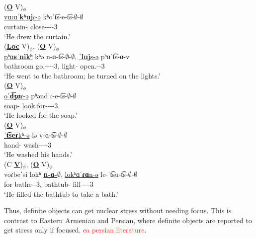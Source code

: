 \begin{exe}
\begin{xlist}
		\ex \glll   (\textbf{\underline{O}} V)$_\phi$ \\
		\underline{vɑɾɑˈ\textbf{kʰuj}ɾ-ə} kʰoˈt͡s-e-t͡s-$\emptyset$-$\emptyset$\\
		curtain-{} close-{\thgloss}-{\aorperf}-{\pst}-3{\sg} \\
		\trans `He drew the curtain.' \\
		\ex \glll   (\textbf{\underline{Loc}} V)$_\phi$,    (\textbf{\underline{O}} V)$_\phi$ \\
		\underline{pʰɑʁˈ\textbf{nikʰ}}  kʰəˈn-ɑ-t͡s-$\emptyset$-$\emptyset$,  \underline{ˈ\textbf{luj}s-ə} pʰɑˈt͡s-ɑ-v \\
		bathroom go.{\aorperf}-{\thgloss}-{\aorperf}-{\pst}-3{\sg},  light-{}  open.{\aorperf}-{\pst}-3{\sg} \\
		\trans `He  went to the bathroom;  he  turned on the lights.'
		\\ 
		\ex \glll    (\textbf{\underline{O}} V)$_\phi$ \\
		\underline{oˈ\textbf{d͡ʒɑ}ɾ-ə} pʰəndˈɾ-e-t͡s-$\emptyset$-$\emptyset$  \\
		soap-{} look.for-{\thgloss}-{\aorperf}-{\pst}-3{\sg}\\
		\trans `He looked for the soap.'
		\\ 
		\ex \glll    (\textbf{\underline{O}} V)$_\phi$ \\
		\underline{ˈ\textbf{t͡seɾ}kʰ-ə} ləˈv-ɑ-t͡s-$\emptyset$-$\emptyset$ \\
		hand-  wash-{\thgloss}-{\aorperf}-{\pst}-3{\sg}\\
		\trans `He washed his hands.'
		\\ 
		\ex \glll   (C \textbf{\underline{V}})$_\phi$,  (\textbf{\underline{O}} V)$_\phi$ \\
		voɾbeˈsi lokʰˈ\underline{\textbf{n-ɑ-$\emptyset$}},   \underline{lokʰɑˈ\textbf{ɾɑ}n-ə} le-ˈt͡su-t͡s-$\emptyset$-$\emptyset$  \\
		for bathe-{\thgloss}-3{\sg}, bathtub-{} fill-{\caus}-{\aorperf}-{\pst}-3{\sg} \\
		\trans `He  filled the bathtub to take a bath.'
		\\ 
	\end{xlist}
\end{exe}

Thus, definite objects can get nuclear stress without needing focus. This is contrast to Eastern Armenian and Persian, where definite objects are reported to get stress only if focused. \textcolor{red}{ea persian literature}. 


